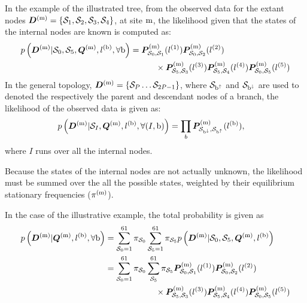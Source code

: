 In the example of the illustrated tree, from the observed data for the extant nodes $\bm{D}^{(\text{m})} = \{ \mathcal{S}_1,\mathcal{S}_2, \mathcal{S}_3, \mathcal{S}_4 \}$, at site $\text{m}$, the \gls{likelihood} given that the states of the internal nodes are known is computed as:
\begin{align}
    p\left(\bm{D}^{(\text{m})}| \mathcal{S}_0, \mathcal{S}_5, \bm{Q}^{(\text{m})}, l^{(\text{b})}, \forall \text{b} \right) & = \bm{P}^{(\text{m})}_{\mathcal{S}_0, \mathcal{S}_1}(l^{(1)})
    \bm{P}^{(\text{m})}_{\mathcal{S}_0, \mathcal{S}_2}(l^{(2)}) \\
    & \quad \quad \quad
    \times \bm{P}^{(\text{m})}_{\mathcal{S}_5, \mathcal{S}_3}(l^{(3)})
    \bm{P}^{(\text{m})}_{\mathcal{S}_5, \mathcal{S}_4}(l^{(4)})
    \bm{P}^{(\text{m})}_{\mathcal{S}_0, \mathcal{S}_5}(l^{(5)}) \notag
\end{align}
In the general topology, $\bm{D}^{(\text{m})} = \{ \mathcal{S}_P \hdots \mathcal{S}_{2P-1} \}$, where $\mathcal{S}_{\text{b}^{\uparrow}}$ and $\mathcal{S}_{\text{b}^{\downarrow}}$ are used to denoted the respectively the parent and descendant nodes of a branch, the \gls{likelihood} of the observed data is given as:
\begin{align}
    p\left(\bm{D}^{(\text{m})}| \mathcal{S}_{I}, \bm{Q}^{(\text{m})}, l^{(\text{b})}, \forall (I, \text{b}) \right) & = \prod_{b} \bm{P}^{(\text{m})}_{\mathcal{S}_{\text{b}^{\downarrow}}, \mathcal{S}_{\text{b}^{\uparrow}}}(l^{(\text{b})}),
\end{align}
where $I$ runs over all the internal nodes.

Because the states of the internal nodes are not actually unknown, the \gls{likelihood} must be summed over the all the possible states, weighted by their equilibrium stationary frequencies ($\pi^{(\text{m})}$).

In the case of the illustrative example, the total probability is given as
\begin{align}
    p\left(\bm{D}^{(\text{m})}| \bm{Q}^{(\text{m})}, l^{(\text{b})} , \forall \text{b} \right) & = \sum\limits_{\mathcal{S}_0=1}^{61} \pi_{\mathcal{S}_0} \sum\limits_{\mathcal{S}_5=1}^{61} \pi_{\mathcal{S}_5} p\left(\bm{D}^{(\text{m})}| \mathcal{S}_0, \mathcal{S}_5, \bm{Q}^{(\text{m})}, l^{(\text{b})} \right) \\
    & = \sum\limits_{\mathcal{S}_0=1}^{61} \pi_{\mathcal{S}_0} \sum\limits_{\mathcal{S}_5}^{61} \pi_{\mathcal{S}_5} \bm{P}^{(\text{m})}_{\mathcal{S}_0, \mathcal{S}_1}(l^{(1)})
    \bm{P}^{(\text{m})}_{\mathcal{S}_0, \mathcal{S}_2}(l^{(2)}) \\
    & \qquad \qquad \qquad
    \times \bm{P}^{(\text{m})}_{\mathcal{S}_5, \mathcal{S}_3}(l^{(3)})
    \bm{P}^{(\text{m})}_{\mathcal{S}_5, \mathcal{S}_4}(l^{(4)})
    \bm{P}^{(\text{m})}_{\mathcal{S}_0, \mathcal{S}_5}(l^{(5)})\notag
\end{align}

